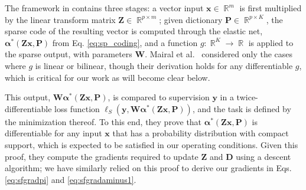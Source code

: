 \documentclass[10pt,twocolumn,letterpaper]{article}
\newcommand{\reals}{\mathop \mathbb{R}}
\newcommand{\argmnmz}[1][]{\ensuremath{\arg\;\underset{#1}{\min}\:\:}}
\renewcommand{\vec}{\mathbf}
\newcommand{\grad}[2]{\nabla_{\!\! #1} #2}
\newcommand{\loss}{\ensuremath{\ell}}
\newcommand{\x}{\vec{x}}
\newcommand{\y}{\vec{y}}
\newcommand{\Z}{\vec{Z}}
\newcommand{\D}{\vec{D}}
\newcommand{\W}{\vec{W}}
\renewcommand{\P}{\vec{P}}
\newcommand{\balpha}{\boldsymbol{\alpha}}
\newcommand{\bbeta}{\boldsymbol{\beta}}
\begin{document}
The framework in \cite{MaBaPoTPAMI2012} contains three stages: a vector input 
$\x\in\reals^m$ is first multiplied by the linear transform matrix 
$\Z\in\reals^{p\times m}$; 
given dictionary $\P\in\reals^{p\times K}$,
the sparse code of the resulting vector
is computed through the elastic net, $\balpha^*(\Z\x,\P)$ from Eq. \ref{eq:sp_coding},
% 
% 
and a 
function $g:\reals^K\to\reals$ is applied to the sparse output, with parameters 
$\W$. Mairal et al.~\cite{MaBaPoTPAMI2012} considered only the cases where $g$ 
is linear or bilinear, though their derivation holds for any differentiable 
$g$, which is critical for our work as will become clear below.

This output, $\W\balpha^*(\Z\x,\P)$, is compared to supervision $\y$ in a twice-differentiable loss function $\loss_S(\y,\W\balpha^*(\Z\x,\P))$, and the task is defined by the minimization thereof. To this end, they prove that $\balpha^*(\Z\x,\P)$ is differentiable for any input $\x$ that has a probability distribution with compact support, which is expected to be satisfied in our operating conditions.  Given this proof, they compute the gradients required to update $\Z$ and $\D$ using a descent algorithm; we have similarly relied on this proof to derive our gradients in Eqs. \ref{eq:sfgradpi} and \ref{eq:sfgradaminus1}.

\end{document}
